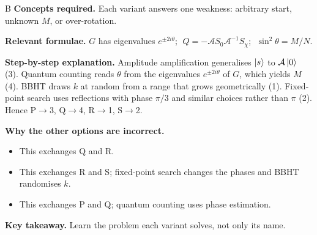 \documentclass[11pt,a4paper]{article}
\newcommand{\qsep}{\par\vspace{2pt}{\color{black!15}\hrule}\vspace{4pt}}
\begin{document}
\begin{solbox}{B}
\textbf{\color{brand}Concepts required.} Each variant answers one weakness: arbitrary start, unknown $M$, or over-rotation.

\textbf{\color{brand}Relevant formulae.} $G$ has eigenvalues $e^{\pm2i\theta}$; $\;Q = -\mathcal{A}S_0\mathcal{A}^{-1}S_\chi$; $\;\sin^2\theta = M/N$.

\textbf{\color{brand}Step-by-step explanation.} Amplitude amplification generalises $\ket{s}$ to $\mathcal{A}\ket{0}$ (3). Quantum counting reads $\theta$ from the eigenvalues $e^{\pm2i\theta}$ of $G$, which yields $M$ (4). BBHT draws $k$ at random from a range that grows geometrically (1).
Fixed-point search uses reflections with phase $\pi/3$ and similar choices rather than $\pi$ (2). Hence P$\to$3, Q$\to$4, R$\to$1, S$\to$2.

\textbf{\color{brand}Why the other options are incorrect.}
\begin{itemize}[leftmargin=2.4em, itemsep=1pt, topsep=2pt]
\item[\textbf{(A)}] This exchanges Q and R.
\item[\textbf{(C)}] This exchanges R and S; fixed-point search changes the phases and BBHT randomises $k$.
\item[\textbf{(D)}] This exchanges P and Q; quantum counting uses phase estimation.
\end{itemize}
\textbf{\color{brand}Key takeaway.} Learn the problem each variant solves, not only its name.
\end{solbox}
\qsep
\end{document}
